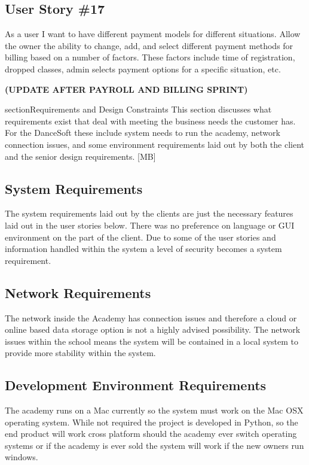 \subsection{User Story \#17}
As a user I want to have different payment models for different situations. Allow the owner the ability to change, add, and select different payment methods for billing based on a number of factors. These factors include time of registration, dropped classes, admin selects payment options for a specific situation, etc.

\bf(UPDATE AFTER PAYROLL AND BILLING SPRINT)



section{Requirements and Design Constraints}
This section discusses what requirements exist that deal with meeting the business needs the customer has. For the DanceSoft these include system needs to run the academy, network connection issues, and some environment requirements laid out by both the client and the senior design requirements. [MB]


\subsection{System  Requirements}
The system requirements laid out by the clients are just the necessary features laid out in the user stories below. There was no preference on language or GUI environment on the part of the client. Due to some of the user stories and information handled within the system a level of security becomes a system requirement. 


\subsection{Network Requirements}
The network inside the Academy has connection issues and therefore a cloud or online based data storage option is not a highly advised possibility. The network issues within the school means the system will be contained in a local system to provide more stability within the system.


\subsection{Development Environment Requirements}
The academy runs on a Mac currently so the system must work on the Mac OSX operating system. While not required the project is developed in Python, so the end product will work cross platform should the academy ever switch operating systems or if the academy is ever sold the system will work if the new owners run windows.



